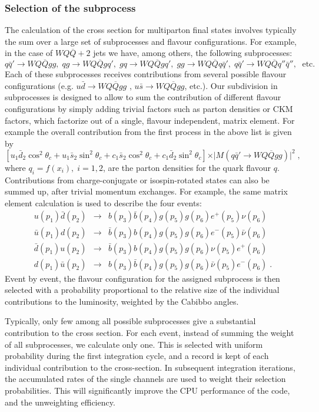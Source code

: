 \documentclass[paper]{JHEP3}
\def    \be             {\begin{equation}}
\def    \ee             {\end{equation}}
\def    \ba             {\begin{eqnarray}}
\def    \ea             {\end{eqnarray}}
\def    \nn             {\nonumber}
\def    \nubar   {\bar{\nu}}
\def    \ubar   {\bar{u}}
\def    \dbar   {\bar{d}}
\def    \qbar   {\bar{q}}
\def    \bbar   {\bar{b}}
\def    \Qbar   {\overline{Q}}
\begin{document}
\subsubsection{Selection of the subprocess}
The calculation of the cross section for  multiparton final
states involves typically the sum over a large set of subprocesses
and flavour configurations. For example, in the case of $WQ\Qbar+2$
jets we have, among others, the following subprocesses:
\be q\qbar' \to W Q\Qbar g g, \;
q g \to W Q\Qbar g  q' , \;
g q \to  W Q\Qbar g  q' , \;
gg \to W Q\Qbar q \qbar' , \;
q\qbar' \to W Q \Qbar q'' \qbar''  , \; 
{\mbox{ etc.}}
\ee
Each of these subprocesses receives contributions from several
possible flavour configurations (e.g. $u\bar{d} \to W Q \Qbar gg$ ,
$u\bar{s} \to W Q \Qbar gg$, etc.). Our subdivision in subprocesses is
designed to allow to sum the contribution of different flavour
configurations by simply adding trivial factors such as parton
densities or CKM factors, which factorize out of a single, flavour
independent,  matrix element. For example the overall
contribution from the first process in the above list is given by 
\be \label{eq:ckm}
\left [ u_1\bar{d}_2\cos^2\theta_c + u_1\bar{s}_2\sin^2\theta_c +
  c_1\bar{s}_2\cos^2\theta_c + c_1\bar{d}_2\sin^2\theta_c \right ]
\times \vert M(q\qbar' \to W Q\Qbar g g)\vert^2 \; , 
\ee 
where $q_i=f(x_i),\; i=1,2$,  are the parton densities for the
quark flavour $q$. 
Contributions from
charge-conjugate or isospin-rotated states can also be summed up,
after trivial momentum exchanges. 
For example, the same matrix element
calculation is used to describe  the four events:
\ba
u(p_1) \dbar(p_2) &\to& b(p_3) \bbar(p_4) g(p_5) g(p_6) e^+(p_5)
\nu(p_6)
\nn \\
\ubar(p_1) d(p_2) &\to& \bbar(p_3) b(p_4) g(p_5) g(p_6) e^-(p_5)
\nubar(p_6)
\nn \\
\dbar(p_1) u(p_2) &\to& \bbar(p_3) b(p_4) g(p_5) g(p_6) \nu(p_5)
e^+(p_6)
\nn \\
d(p_1) \ubar(p_2) &\to& b(p_3) \bbar(p_4) g(p_5) g(p_6) \nubar(p_5)
e^-(p_6) \; . \nn
\ea
Event by event, the flavour configuration for the
assigned subprocess is then selected with a probability
proportional to the relative size of the individual contributions to
the luminosity, weighted by the Cabibbo angles. 

Typically, only few among all possible subprocesses give a substantial
contribution to the cross section. For each event, instead of summing
the weight of all subprocesses, we calculate only one. This is
selected with uniform probability during the first integration cycle,
and a record is kept of each individual
contribution to the cross-section. In subsequent integration
iterations, the accumulated rates of the single channels are used to
weight their selection probabilities. This will significantly improve
the CPU performance of the code, and the unweighting efficiency.
\end{document}
